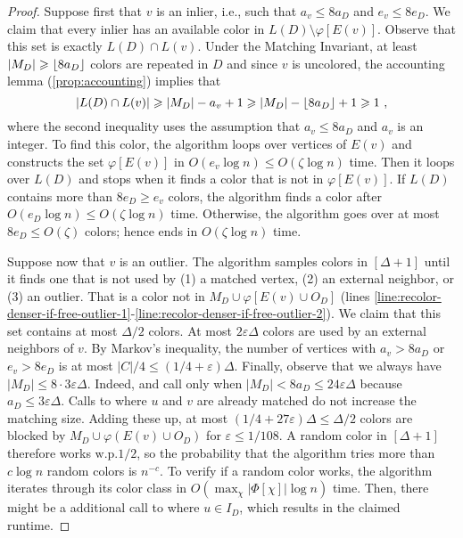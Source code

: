 \documentclass[a4paper,english,11pt]{amsart}
\theoremstyle{definition}
\renewcommand{\leq}{\leqslant}
\renewcommand{\geq}{\geqslant}
\DeclarePairedDelimiter{\floor}{\lfloor}{\rfloor}
\newcommand{\eps}{\varepsilon}
\renewcommand{\wp}{$\text{w.p.}$\xspace}
\newcommand{\col}{\varphi}
\begin{document}
\begin{proof}
    Suppose first that $v$ is an inlier, i.e., such that $a_v \leq 8 a_D$ and $e_v \leq 8 e_D$. We claim that every inlier has an available color in $L(D) \setminus \col[E(v)]$. Observe that this set is exactly $L(D) \cap L(v)$. Under the Matching Invariant, at least $|M_D| \geq \floor{ 8 a_D }$ colors are repeated in $D$ and since $v$ is uncolored, the accounting lemma (\cref{prop:accounting}) implies that
    \[
    |L(D) \cap L(v)|
    \geq |M_D| - a_v + 1
    \geq |M_D| - \floor{ 8 a_D } +1 \geq 1 \ ,
    \]
    where the second inequality uses the assumption that $a_v \leq 8 a_D$ and $a_v$ is an integer. To find this color, the algorithm loops over vertices of $E(v)$ and constructs the set $\col[E(v)]$ in $O(e_v \log n) \leq O(\zeta \log n)$ time. Then it loops over $L(D)$ and stops when it finds a color that is not in $\col[E(v)]$. If $L(D)$ contains more than $8e_D \geq e_v$ colors, the algorithm finds a color after $O(e_D \log n) \leq O( \zeta \log n)$ time. Otherwise, the algorithm goes over at most $8e_D \leq O(\zeta)$ colors; hence ends in $O(\zeta \log n)$ time.

    Suppose now that $v$ is an outlier. The algorithm samples colors in $[\Delta+1]$ until it finds one that is not used by (1) a matched vertex, (2) an external neighbor, or (3) an outlier. That is a color not in $M_D \cup \col[ E(v) \cup O_D ]$ (lines \ref{line:recolor-denser-if-free-outlier-1}-\ref{line:recolor-denser-if-free-outlier-2}). We claim that this set contains at most $\Delta/2$ colors.
    At most $2\eps\Delta$ colors are used by an external neighbors of $v$. By Markov's inequality, the number of vertices with $a_v > 8a_D$ or $e_v > 8e_D$ is at most $|C|/4 \leq (1/4 + \eps)\Delta$. Finally, observe that we always have $|M_D| \leq 8 \cdot 3\eps\Delta$. Indeed, \RecolorInsert and \RecolorDelete call \AddAntiEdgeMatching only when $|M_D| < 8 a_D \leq 24\eps\Delta$ because $a_D \leq 3\eps\Delta$. Calls to  where $u$ and $v$ are already matched do not increase the matching size.
    Adding these up, at most $(1/4 + 27\eps)\Delta \leq \Delta/2$ colors are blocked by $M_D \cup \col( E(v) \cup O_D )$ for $\eps \leq 1/108$.
    A random color in $[\Delta+1]$ therefore works \wp $1/2$, so the probability that the algorithm tries more than $c\log n$ random colors is $n^{-c}$. To verify if a random color works, the algorithm iterates through its color class in $O(\max_\chi |\Phi[\chi]|\log n)$ time. Then, there might be a additional call to  where $u \in I_D$, which results in the claimed runtime.
\end{proof}
\end{document}
